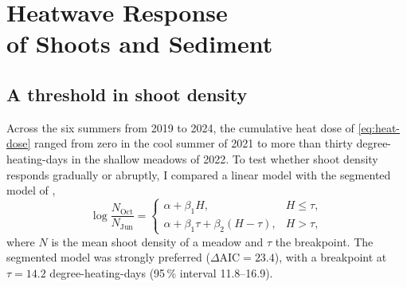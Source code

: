 \chapter[Heatwave Response of Shoots and Sediment]{Heatwave Response\\ of Shoots and Sediment}
\label{ch:heatwave-response}

\section{A threshold in shoot density}
\label{sec:threshold}

Across the six summers from 2019 to 2024, the cumulative heat dose of
\cref{eq:heat-dose} ranged from zero in the cool summer of 2021 to more
than thirty degree-heating-days in the shallow meadows of 2022. To test
whether shoot density responds gradually or abruptly, I compared a linear
model with the segmented model of \textcite{vandermeer2016segmented},
\begin{equation}
  \log \frac{N_{\text{Oct}}}{N_{\text{Jun}}} =
  \begin{cases}
    \alpha + \beta_1 H, & H \le \tau,\\[0.4ex]
    \alpha + \beta_1 \tau + \beta_2 (H - \tau), & H > \tau,
  \end{cases}
  \label{eq:segmented}
\end{equation}
where \(N\) is the mean shoot density of a meadow and \(\tau\) the
breakpoint. The segmented model was strongly preferred
(\(\Delta\mathrm{AIC} = 23.4\)), with a breakpoint at
\(\tau = 14.2\) degree-heating-days (95\,\% interval 11.8--16.9).

